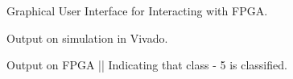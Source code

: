 \documentclass{article}
\begin{document}
  \begin{figure}[!hbt]
        \noindent{}
        \caption{Graphical User Interface for Interacting with FPGA. }
    \end{figure}
    
    \begin{figure}[!hbt]
        \noindent{}
        \caption{Output on simulation in Vivado.}
    \end{figure}
    
    \begin{figure}[!hbt]
        \noindent{}
        \caption{Output on FPGA || Indicating that class - 5 is classified.}
    \end{figure}
\end{document}
